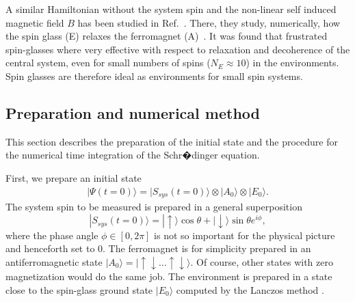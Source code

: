 \documentclass[showpacs,preprintnumbers,amsmath,amssymb,12pt]{revtex4-2}
\begin{document}
A similar Hamiltonian without the system spin and the non-linear self
induced magnetic field $B$ has been studied in
Ref.~\cite{yuanmain}. There, they study, numerically, how the spin
glass (E) relaxes the ferromagnet (A)~\cite{yuanmain,yuanbath,
  yuangiant}. It was found that frustrated spin-glasses where very
effective with respect to relaxation and decoherence of the central
system, even for small numbers of spins ($N_E\approx10$) in the
environments. Spin glasses are therefore ideal as environments for
small spin systems.

\subsection{Preparation and numerical method}
This section describes the preparation of the initial state and the
procedure for the numerical time integration of the Schr�dinger
equation.

First, we prepare an initial state
\begin{eqnarray}
  |\Psi(t=0) \rangle = |S_{sys}(t \!=\! 0) \rangle \otimes |A_0 \rangle 
  \otimes |E_0 \rangle. 
\label{InitState}
\end{eqnarray}
The system spin to be measured is prepared in a general superposition
\begin{equation}
  |S_{sys}(t \!=\! 0) \rangle = |\uparrow\rangle\cos{\theta}
  + |\downarrow \rangle\sin{\theta}e^{i\phi},
\label{preparation}
\end{equation}
where the phase angle $\phi\in[0,2\pi]$ is not so important for the
physical picture and henceforth set to 0. The ferromagnet is for
simplicity prepared in an antiferromagnetic state $|A_0\rangle = |
\uparrow \downarrow ... \uparrow \downarrow \rangle$. Of course, other
states with zero magnetization would do the same job.  The environment
is prepared in a state close to the spin-glass ground state
$|E_0\rangle$ computed by the Lanczos method \cite{hollenberg}.
\end{document}
